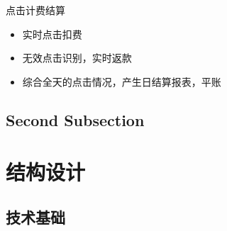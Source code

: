 \documentclass{beamer}
\begin{document}
\begin{CJK}{UTF8}{gbsn}
\begin{frame}{点击计费结算}
  \begin{itemize}
  \item {
    实时点击扣费
  }
  \item {
    无效点击识别，实时返款
  }
  \item {
    综合全天的点击情况，产生日结算报表，平账
  }
  \end{itemize}
\end{frame}

\subsection{Second Subsection}


\section{结构设计}

\subsection{技术基础}


\end{CJK}
\end{document}
